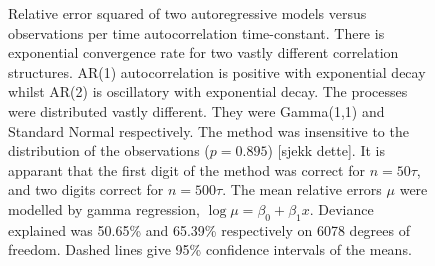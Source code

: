 \documentclass[11pt,english,a4paper]{article}
\begin{document}
\begin{figure}[!htbp]

	
	
  	\caption{Relative error squared of two autoregressive models versus observations per time autocorrelation time-constant. There is exponential convergence rate for two vastly different correlation structures. AR(1) autocorrelation is positive with exponential decay whilst AR(2) is oscillatory with exponential decay. The processes were distributed vastly different. They were Gamma(1,1) and Standard Normal respectively. The method was insensitive to the distribution of the observations ($p = 0.895$) [sjekk dette]. It is apparant that the first digit of the method was correct for $n = 50\tau$, and two digits correct for $n = 500\tau$. The mean relative errors $\mu$ were modelled by gamma regression, $\log \mu = \beta_0 + \beta_1 x$. Deviance explained was 50.65\% and 65.39\% respectively on 6078 degrees of freedom. Dashed lines give 95\% confidence intervals of the means.} \label{fig:figure1}
  	
\end{figure}
\end{document}
